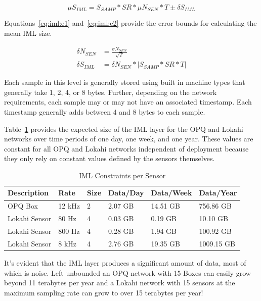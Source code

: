 \begin{equation}\label{eq:iml:mu_size_iml}
\mu S_{IML} = S_{SAMP} * SR * \mu N_{SEN} * T \pm \delta S_{IML}
\end{equation}

Equations~\ref{eq:iml:e1} and~\ref{eq:iml:e2} provide the error bounds for calculating the mean IML size.

\begin{align}
	\delta N_{SEN} &= \frac{\sigma N_{SEN}}{\sqrt{T}} \label{eq:iml:e1} \\
	\delta S_{IML} &= \delta N_{SEN} * |S_{SAMP} * SR * T| \label{eq:iml:e2}
\end{align}

Each sample in this level is generally stored using built in machine types that generally take 1, 2, 4, or 8 bytes. Further, depending on the network requirements, each sample may or may not have an associated timestamp. Each timestamp generally adds between 4 and 8 bytes to each sample.

Table~\ref{table:iml_size} provides the expected size of the IML layer for the OPQ and Lokahi networks over time periods of one day, one week, and one year. These values are constant for all OPQ and Lokahi networks independent of deployment because they only rely on constant values defined by the sensors themselves.

\begin{table}[H]
	\centering
	\caption{IML Constraints per Sensor}
	\begin{tabularx}{\textwidth}{Xlllll}
		\toprule
		\textbf{Description} & \textbf{Rate} & \textbf{Size} & \textbf{Data/Day} & \textbf{Data/Week} & \textbf{Data/Year} \\
		\midrule
		OPQ Box & 12 kHz & 2 & 2.07 GB & 14.51 GB & 756.86 GB \\
		Lokahi Sensor & 80 Hz & 4 & 0.03 GB & 0.19 GB & 10.10 GB \\
		Lokahi Sensor & 800 Hz & 4 & 0.28 GB & 1.94 GB & 100.92 GB \\
		Lokahi Sensor & 8 kHz & 4 & 2.76 GB & 19.35 GB & 1009.15 GB \\
		\bottomrule
	\end{tabularx}
	\label{table:iml_size}
\end{table}

It's evident that the IML layer produces a significant amount of data, most of which is noise. Left unbounded an OPQ network with 15 Boxes can easily grow beyond 11 terabytes per year and a Lokahi network with 15 sensors at the maximum sampling rate can grow to over 15 terabytes per year!

